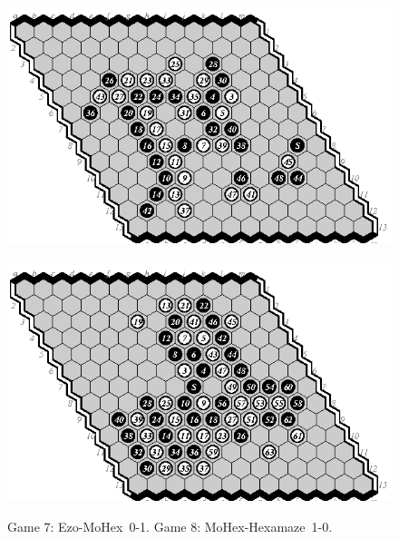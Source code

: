 \documentclass{icga}
\def\Eo{\mbox{\sc Ezo}}
\def\Hz{\mbox{\sc Hexamaze}}
\def\Mx{\mbox{\sc MoHex}}
\begin{document}
\begin{figure}[hbp]
\includegraphics[scale=1.2]{games/pix/13-07-em-0-1.eps}\hspace*{-1cm}\
\includegraphics[scale=1.2]{games/pix/13-08-mh-1-0.eps}
\caption{Game 7: \Eo-\Mx\ 0-1. Game 8: \Mx-\Hz\ 1-0.}
\end{figure}
\end{document}

